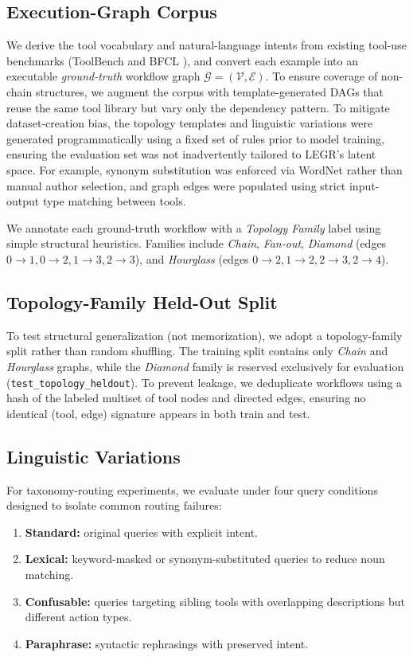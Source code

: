 \documentclass{article}
\begin{document}
\subsection{Execution-Graph Corpus}
We derive the tool vocabulary and natural-language intents from existing tool-use benchmarks (ToolBench \cite{qin2023toolllm} and BFCL \cite{yan2024berkeley}), and convert each example into an executable \emph{ground-truth} workflow graph $\mathcal{G}=(\mathcal{V},\mathcal{E})$. To ensure coverage of non-chain structures, we augment the corpus with template-generated DAGs that reuse the same tool library but vary only the dependency pattern. To mitigate dataset-creation bias, the topology templates and linguistic variations were generated programmatically using a fixed set of rules prior to model training, ensuring the evaluation set was not inadvertently tailored to LEGR's latent space. For example, synonym substitution was enforced via WordNet \cite{miller1995wordnet} rather than manual author selection, and graph edges were populated using strict input-output type matching between tools.

We annotate each ground-truth workflow with a \textit{Topology Family} label using simple structural heuristics. Families include \textit{Chain}, \textit{Fan-out}, \textit{Diamond} (edges $0\to1, 0\to2, 1\to3, 2\to3$), and \textit{Hourglass} (edges $0\to2, 1\to2, 2\to3, 2\to4$).

\subsection{Topology-Family Held-Out Split}
To test structural generalization (not memorization), we adopt a topology-family split rather than random shuffling. The training split contains only \textit{Chain} and \textit{Hourglass} graphs, while the \textit{Diamond} family is reserved exclusively for evaluation (\texttt{test\_topology\_heldout}). To prevent leakage, we deduplicate workflows using a hash of the labeled multiset of tool nodes and directed edges, ensuring no identical (tool, edge) signature appears in both train and test.

\subsection{Linguistic Variations}
For taxonomy-routing experiments, we evaluate under four query conditions designed to isolate common routing failures:
\begin{enumerate}
    \item \textbf{Standard:} original queries with explicit intent.
    \item \textbf{Lexical:} keyword-masked or synonym-substituted queries to reduce noun matching.
    \item \textbf{Confusable:} queries targeting sibling tools with overlapping descriptions but different action types.
    \item \textbf{Paraphrase:} syntactic rephrasings with preserved intent.
\end{enumerate}
\end{document}
